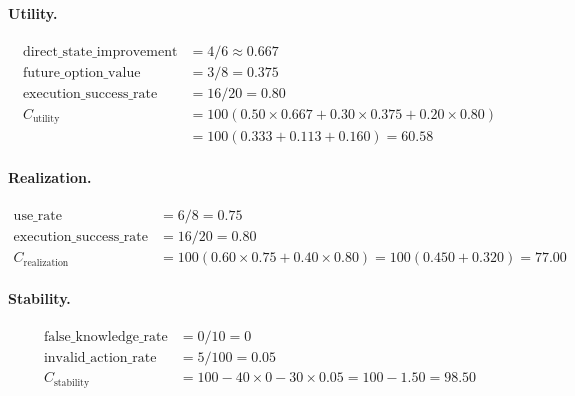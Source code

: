 \documentclass[a4paper, 11pt]{article}
\begin{document}
\paragraph{Utility.}
\begin{align*}
    \text{direct\_state\_improvement} &= 4/6 \approx 0.667 \\
    \text{future\_option\_value} &= 3/8 = 0.375 \\
    \text{execution\_success\_rate} &= 16/20 = 0.80 \\
    C_{\text{utility}} &= 100(0.50 \times 0.667 + 0.30 \times 0.375 + 0.20 \times 0.80) \\
    &= 100(0.333 + 0.113 + 0.160) = \mathbf{60.58}
\end{align*}

\paragraph{Realization.}
\begin{align*}
    \text{use\_rate} &= 6/8 = 0.75 \\
    \text{execution\_success\_rate} &= 16/20 = 0.80 \\
    C_{\text{realization}} &= 100(0.60 \times 0.75 + 0.40 \times 0.80) = 100(0.450 + 0.320) = \mathbf{77.00}
\end{align*}

\paragraph{Stability.}
\begin{align*}
    \text{false\_knowledge\_rate} &= 0/10 = 0 \\
    \text{invalid\_action\_rate} &= 5/100 = 0.05 \\
    C_{\text{stability}} &= 100 - 40 \times 0 - 30 \times 0.05 = 100 - 1.50 = \mathbf{98.50}
\end{align*}
\end{document}
